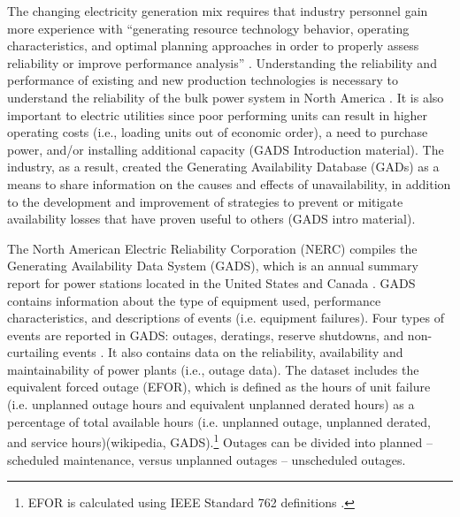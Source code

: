 \documentclass[10pt]{amsart}
\begin{document}
	The changing electricity generation mix requires that industry personnel gain more experience with ``generating resource technology behavior, operating characteristics, and optimal planning approaches in order to properly assess reliability or improve performance analysis'' \parencite{nerc2011gads}. 
	Understanding the reliability and performance of existing and new production technologies is necessary to understand the reliability of the bulk power system in North America \parencite{nerc2011gads}. 
	It is also important to electric utilities since poor performing units can result in higher operating costs (i.e., loading units out of economic order), a need to purchase power, and/or installing additional capacity \parencite{}(GADS Introduction material).
	The industry, as a result, created the Generating Availability Database (GADs) as a means to share information on the causes and effects of unavailability, in addition to the development and improvement of strategies to prevent or mitigate availability losses that have proven useful to others \parencite{}(GADS intro material). 
	
	The North American Electric Reliability Corporation (NERC) compiles the Generating Availability Data System (GADS), which is an annual summary report for power stations located in the United States and Canada \parencite{nercgads}. 
	GADS contains information about the type of equipment used, performance characteristics, and descriptions of events (i.e. equipment failures). 
	Four types of events are reported in GADS: outages, deratings, reserve shutdowns, and non-curtailing events \parencite{gugel2015polar}. 
	It also contains data on the reliability, availability and maintainability of power plants (i.e., outage data). 
	The dataset includes the equivalent forced outage (EFOR), which is defined as the hours of unit failure (i.e. unplanned outage hours and equivalent unplanned derated hours) as a percentage of total available hours (i.e. unplanned outage, unplanned derated, and service hours)(wikipedia, GADS).\footnote{EFOR is calculated using IEEE Standard 762 definitions \parencite{gugel2015polar}.} 
	Outages can be divided into planned -- scheduled maintenance, versus unplanned outages -- unscheduled outages. 
	
\end{document}
